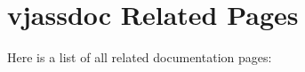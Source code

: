 \section{vjassdoc Related Pages}
Here is a list of all related documentation pages:\begin{CompactList}
\item {}

\end{CompactList}
